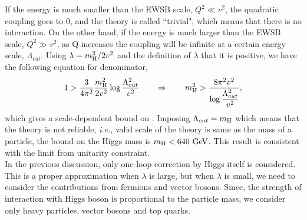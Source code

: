 If the energy is much smaller than the EWSB scale, $Q^2\ll v^2$, 
the quadratic coupling goes to 0, and the theory is called 
``trivial", which means that there is no interaction. 
On the other hand, if the energy is much larger than the EWSB scale, $Q^2\gg v^2$,
as Q increases the coupling will be infinite at a certain energy scale, $\Lambda_{cut}$. 
Using $\lambda = m_{\mathrm{H}}^2/2v^2$ and the definition of $\lambda$ that it is positive, 
we have the following equation for denominator,
\begin{eqnarray} 
1 > \frac{3}{4\pi^2} \frac{m_{\mathrm{H}}^2}{2v^2} \log{\frac{\Lambda_{cut}^2}{v^2}} 
\qquad \Rightarrow  \qquad 
m_{\mathrm{H}}^2 > \frac{8\pi^2v^2}{\log{\displaystyle  \frac{\Lambda_{cut}^2}{v^2}}},
\end{eqnarray} 
which gives a scale-dependent bound on \mHi. Imposing $\Lambda_{cut} = m_{\mathrm{H}}$ 
which means that the theory is not reliable, \textit{i.e.}, valid scale of the theory is same 
as the mass of a particle, the bound on the Higgs mass is $m_{\mathrm{H}} < 640~\mathrm{Ge\kern -0.1em V}$. 
This result is consistent with the limit from unitarity constraint. 
\\

In the previous discussion, only one-loop correction by Higgs itself is considered.
This is a proper approximation when $\lambda$ is large, but
when $\lambda$ is small, we need to consider the contributions from fermions 
and vector bosons. Since, the strength of interaction with Higgs boson is proportional 
to the particle mass, we consider only heavy particles, vector bosons and top quarks.   

